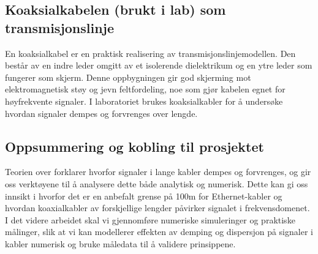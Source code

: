 \subsection{Koaksialkabelen (brukt i lab) som transmisjonslinje}
En koaksialkabel er en praktisk realisering av transmisjonslinjemodellen. Den består av en indre leder omgitt av et isolerende dielektrikum og en ytre leder som fungerer som skjerm. Denne oppbygningen gir god skjerming mot elektromagnetisk støy og jevn feltfordeling, noe som gjør kabelen egnet for høyfrekvente signaler. I laboratoriet brukes koaksialkabler for å undersøke hvordan signaler dempes og forvrenges over lengde.

\subsection{Oppsummering og kobling til prosjektet}

Teorien over forklarer hvorfor signaler i lange kabler dempes og forvrenges, og gir oss verktøyene til å analysere dette både analytisk og numerisk. Dette kan gi oss innsikt i hvorfor det er en anbefalt grense på 100m for Ethernet-kabler og hvordan koaxialkabler av forskjellige lengder påvirker signalet i frekvensdomenet. I det videre arbeidet skal vi gjennomføre numeriske simuleringer og praktiske målinger, slik at vi kan modellerer effekten av demping og dispersjon på signaler i kabler numerisk og bruke måledata til å validere prinsippene.
